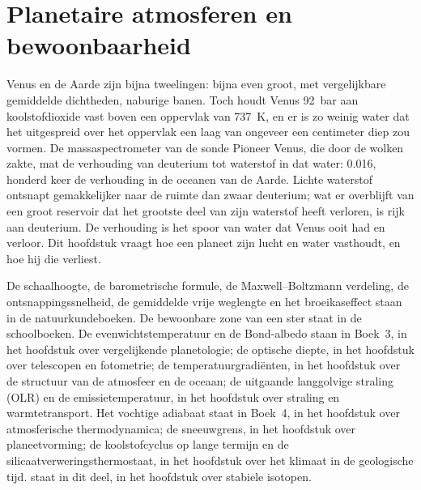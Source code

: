 \chapter{Planetaire atmosferen en bewoonbaarheid}\label{ch:b3:planetary-atmospheres}

Venus en de Aarde zijn bijna tweelingen: bijna even groot, met vergelijkbare gemiddelde
dichtheden, naburige banen. Toch houdt Venus \qty{92}{bar} aan
koolstofdioxide vast boven een oppervlak van \qty{737}{K}, en er is zo weinig water dat het
uitgespreid over het oppervlak een laag van ongeveer een centimeter diep zou vormen. De
massaspectrometer van de sonde Pioneer Venus, die door de wolken zakte,
mat de verhouding van deuterium tot waterstof in dat water: \num{0.016},
honderd keer de verhouding in de oceanen van de Aarde. Lichte waterstof ontsnapt
gemakkelijker naar de ruimte dan zwaar deuterium; wat er overblijft van een groot reservoir
dat het grootste deel van zijn waterstof heeft verloren, is rijk aan deuterium. De verhouding
is het spoor van water dat Venus ooit had en verloor. Dit hoofdstuk vraagt hoe een
planeet zijn lucht en water vasthoudt, en hoe hij die verliest.

\begin{recall}
De schaalhoogte, de barometrische formule, de Maxwell--Boltzmann
verdeling, de ontsnappingssnelheid, de gemiddelde vrije weglengte en het broeikaseffect
staan in de natuurkundeboeken. De bewoonbare zone van een ster staat in de
schoolboeken. De evenwichtstemperatuur en de Bond-albedo staan in Boek~3,
in het hoofdstuk over vergelijkende planetologie; de optische
diepte, in het hoofdstuk over telescopen en fotometrie; de temperatuurgradiënten, in
het hoofdstuk over de structuur van de atmosfeer en de oceaan; de uitgaande
langgolvige straling (OLR) en de emissietemperatuur, in het hoofdstuk over
straling en warmtetransport. Het vochtige adiabaat staat in Boek~4,
in het hoofdstuk over atmosferische thermodynamica; de sneeuwgrens, in het
hoofdstuk over planeetvorming; de koolstofcyclus op lange termijn en de
silicaatverweringsthermostaat, in het hoofdstuk over het klimaat in de geologische
tijd.  staat in dit deel, in het hoofdstuk over stabiele
isotopen.
\end{recall}


